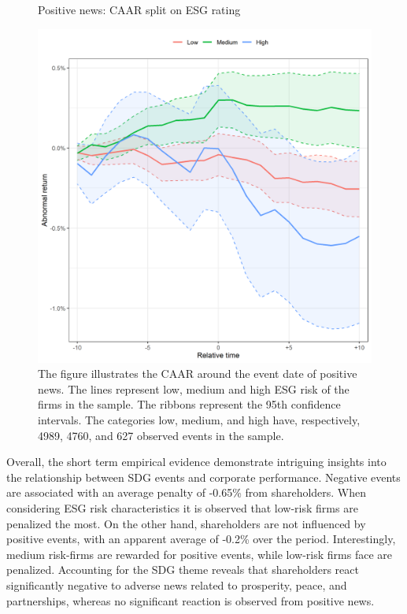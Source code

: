 \begin{figure} [H]
    \centering
    \caption{Positive news: CAAR split on ESG rating}
    \includegraphics[scale=0.6]{Projekt/1.Figures analysis/ST_positive_ESG.png}
     \caption*{\footnotesize The figure illustrates the CAAR around the event date of positive news. The lines represent low, medium and high ESG risk of the firms in the sample. The ribbons represent the 95th confidence intervals. The categories low, medium, and high have, respectively, 4989, 4760, and 627 observed events in the sample.  }
    \label{fig:ST_pos_ESG}
\end{figure} 

Overall, the short term empirical evidence demonstrate intriguing  insights into the relationship between SDG events and corporate performance. Negative events are associated with an average penalty of -0.65\% from shareholders. When considering ESG risk characteristics  it is observed that low-risk firms are penalized the most. On the other hand, shareholders are not influenced by positive events, with an apparent average of -0.2\% over the period. Interestingly, medium risk-firms are rewarded for positive events, while low-risk firms face are penalized. Accounting for the SDG theme reveals that shareholders react significantly negative to adverse news related to prosperity, peace, and partnerships, whereas no significant reaction is observed from positive news. 

